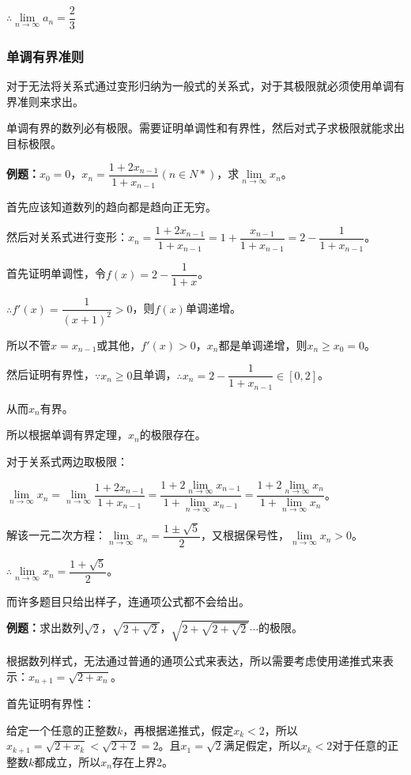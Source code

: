 \documentclass[UTF8, 12pt]{ctexart}
\begin{document}
$\therefore\lim\limits_{n\to\infty}a_n=\dfrac{2}{3}$

\subsubsection{单调有界准则}

对于无法将关系式通过变形归纳为一般式的关系式，对于其极限就必须使用单调有界准则来求出。

单调有界的数列必有极限。需要证明单调性和有界性，然后对式子求极限就能求出目标极限。

\textbf{例题：}$x_0=0$，$x_n=\dfrac{1+2x_{n-1}}{1+x_{n-1}}(n\in N*)$，求$\lim\limits_{n\to\infty}x_n$。\medskip

首先应该知道数列的趋向都是趋向正无穷。

然后对关系式进行变形：$x_n=\dfrac{1+2x_{n-1}}{1+x_{n-1}}=1+\dfrac{x_{n-1}}{1+x_{n-1}}=2-\dfrac{1}{1+x_{n-1}}$。

首先证明单调性，令$f(x)=2-\dfrac{1}{1+x}$。

$\therefore f'(x)=\dfrac{1}{(x+1)^2}>0$，则$f(x)$单调递增。

所以不管$x=x_{n-1}$或其他，$f'(x)>0$，$x_n$都是单调递增，则$x_n\geqslant x_0=0$。

然后证明有界性，$\because x_n\geqslant 0$且单调，$\therefore x_n=2-\dfrac{1}{1+x_{n-1}}\in[0,2]$。

从而$x_n$有界。

所以根据单调有界定理，$x_n$的极限存在。

对于关系式两边取极限：

$\lim\limits_{n\to\infty}x_n=\lim\limits_{n\to\infty}\dfrac{1+2x_{n-1}}{1+x_{n-1}}=\dfrac{1+2\lim\limits_{n\to\infty}x_{n-1}}{1+\lim\limits_{n\to\infty}x_{n-1}}=\dfrac{1+2\lim\limits_{n\to\infty}x_n}{1+\lim\limits_{n\to\infty}x_n}$。

解该一元二次方程：$\lim\limits_{n\to\infty}x_n=\dfrac{1\pm\sqrt{5}}{2}$，又根据保号性，$\lim\limits_{n\to\infty}x_n>0$。

$\therefore\lim\limits_{n\to\infty}x_n=\dfrac{1+\sqrt{5}}{2}$。

而许多题目只给出样子，连通项公式都不会给出。\medskip

\textbf{例题：}求出数列$\sqrt{2}$，$\sqrt{2+\sqrt{2}}$，$\sqrt{2+\sqrt{2+\sqrt{2}}}$$\cdots$的极限。

根据数列样式，无法通过普通的通项公式来表达，所以需要考虑使用递推式来表示：$x_{n+1}=\sqrt{2+x_n}$。

首先证明有界性：

给定一个任意的正整数$k$，再根据递推式，假定$x_k<2$，所以$x_{k+1}=\sqrt{2+x_k}<\sqrt{2+2}=2$。且$x_1=\sqrt{2}$满足假定，所以$x_k<2$对于任意的正整数$k$都成立，所以$x_n$存在上界2。
\end{document}
